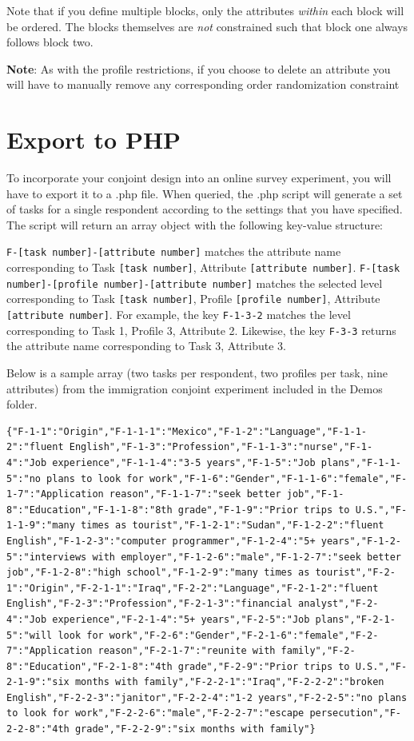\documentclass[12pt]{article}
\begin{document}
Note that if you define multiple blocks, only the attributes \textit{within} each block will be ordered. The blocks themselves are \textit{not} constrained such that block one always follows block two.

\textbf{Note}: As with the profile restrictions, if you choose to delete an attribute you will have to manually remove any corresponding order randomization constraint 

\section{Export to PHP}

To incorporate your conjoint design into an online survey experiment, you will have to export it to a .php file. When queried, the .php script will generate a set of tasks for a single respondent according to the settings that you have specified. The script will return an array object with the following key-value structure:

\texttt{F-[task number]-[attribute number]} matches the attribute name corresponding to Task \texttt{[task number]}, Attribute \texttt{[attribute number]}. \texttt{F-[task number]-[profile number]-[attribute number]} matches the selected level corresponding to Task \texttt{[task number]}, Profile \texttt{[profile number]}, Attribute \texttt{[attribute number]}. For example, the key \texttt{F-1-3-2} matches the level corresponding to Task 1, Profile 3, Attribute 2. Likewise, the key \texttt{F-3-3} returns the attribute name corresponding to Task 3, Attribute 3.

Below is a sample array (two tasks per respondent, two profiles per task, nine attributes) from the immigration conjoint experiment included in the Demos folder.

\begin{lstlisting}
{"F-1-1":"Origin","F-1-1-1":"Mexico","F-1-2":"Language","F-1-1-2":"fluent English","F-1-3":"Profession","F-1-1-3":"nurse","F-1-4":"Job experience","F-1-1-4":"3-5 years","F-1-5":"Job plans","F-1-1-5":"no plans to look for work","F-1-6":"Gender","F-1-1-6":"female","F-1-7":"Application reason","F-1-1-7":"seek better job","F-1-8":"Education","F-1-1-8":"8th grade","F-1-9":"Prior trips to U.S.","F-1-1-9":"many times as tourist","F-1-2-1":"Sudan","F-1-2-2":"fluent English","F-1-2-3":"computer programmer","F-1-2-4":"5+ years","F-1-2-5":"interviews with employer","F-1-2-6":"male","F-1-2-7":"seek better job","F-1-2-8":"high school","F-1-2-9":"many times as tourist","F-2-1":"Origin","F-2-1-1":"Iraq","F-2-2":"Language","F-2-1-2":"fluent English","F-2-3":"Profession","F-2-1-3":"financial analyst","F-2-4":"Job experience","F-2-1-4":"5+ years","F-2-5":"Job plans","F-2-1-5":"will look for work","F-2-6":"Gender","F-2-1-6":"female","F-2-7":"Application reason","F-2-1-7":"reunite with family","F-2-8":"Education","F-2-1-8":"4th grade","F-2-9":"Prior trips to U.S.","F-2-1-9":"six months with family","F-2-2-1":"Iraq","F-2-2-2":"broken English","F-2-2-3":"janitor","F-2-2-4":"1-2 years","F-2-2-5":"no plans to look for work","F-2-2-6":"male","F-2-2-7":"escape persecution","F-2-2-8":"4th grade","F-2-2-9":"six months with family"}
\end{lstlisting}
\end{document}
